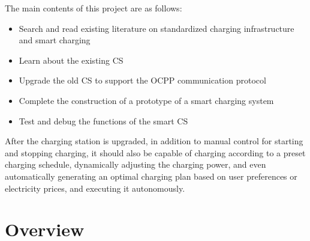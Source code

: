 \documentclass[
	english,
	ruledheaders=section,%
	class=report,%
	thesis={type=Report},%
	accentcolor=9c,%
	custommargins=true,%
	marginpar=false,%
	parskip=half-,%
	fontsize=11pt,%
	logofile={img/tuda_logo.pdf}, %
]{tudapub}
\begin{document}






The main contents of this project are as follows:
\begin{itemize}
    \item Search and read existing literature on standardized charging infrastructure and smart charging
    \item Learn about the existing \ac{CS}
    \item Upgrade the old \ac{CS} to support the \ac{OCPP} communication protocol
    \item Complete the construction of a prototype of a smart charging system
    \item Test and debug the functions of the smart \ac{CS}
\end{itemize}

After the charging station is upgraded, in addition to manual control for starting and stopping charging, it should also be capable of charging according to a preset charging schedule, dynamically adjusting the charging power, and even automatically generating an optimal charging plan based on user preferences or electricity prices, and executing it autonomously.


\section{Overview}
\end{document}
